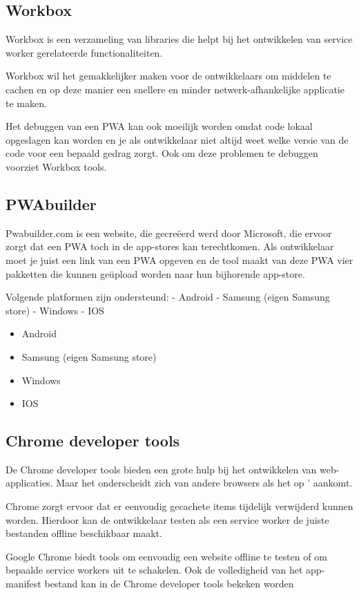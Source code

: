 		

\subsection{Workbox}

	Workbox is een verzameling van libraries die helpt bij het ontwikkelen van service worker gerelateerde functionaliteiten.
	
	Workbox wil het gemakkelijker maken voor de ontwikkelaars om middelen te cachen en op deze manier een snellere en minder netwerk-afhankelijke applicatie te maken.
	
	Het debuggen van een PWA kan ook moeilijk worden omdat code lokaal opgeslagen kan worden en je als ontwikkelaar niet altijd weet welke versie van de code voor een bepaald gedrag zorgt. Ook om deze problemen te debuggen voorziet Workbox tools.
	
	\autocite{Workbox2020}
	

\subsection{PWAbuilder}

	Pwabuilder.com is een website, die gecreëerd werd door Microsoft, die ervoor zorgt dat een PWA toch in de app-stores kan terechtkomen. Als ontwikkelaar moet je juist een link van een PWA opgeven en de tool maakt van deze PWA vier pakketten die kunnen geüpload worden naar hun bijhorende app-store. 
	
	Volgende platformen zijn ondersteund:
	-	Android
	-	Samsung (eigen Samsung store)
	-	Windows
	-	IOS
	
	\begin{itemize}
		\item	Android
		\item	Samsung (eigen Samsung store)
		\item	Windows
		\item	IOS
	\end{itemize}
	\autocite{PWAbuilder2020}
	
	
\subsection{Chrome developer tools}
	De Chrome developer tools bieden een grote hulp bij het ontwikkelen van web-applicaties. Maar het onderscheidt zich van andere browsers als het op ' aankomt. 
	
	Chrome zorgt ervoor dat er eenvoudig gecachete items tijdelijk verwijderd kunnen worden. Hierdoor kan de ontwikkelaar testen als een service worker de juiste bestanden offline beschikbaar maakt.
	
	Google Chrome biedt tools om eenvoudig een website offline te testen of om bepaalde service workers uit te schakelen.
	Ook de volledigheid van het app-manifest bestand kan in de Chrome developer tools bekeken worden
	
	\autocite{Developers2019b}
	

	
	